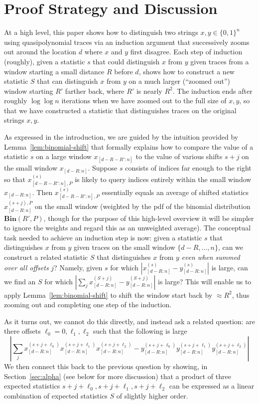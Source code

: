 \documentclass[11pt]{article}
\theoremstyle{plain}
\newcommand{\Bin}[2]{\textbf{Bin}(#1,#2)}
\begin{document}
\section{Proof Strategy and Discussion}\label{sec:overview}

At a high level, this paper shows how to distinguish two strings $x,y\in\{0,1\}^n$ using quasipolynomial traces via an induction argument that successively zooms out around the location $d$ where $x$ and $y$ first disagree. Each step of induction (roughly), given a statistic $s$ that could distinguish $x$ from $y$ given traces from a window starting a small distance $R$ before $d$, shows how to construct a new statistic $S$ that can distinguish $x$ from $y$ on a much larger (``zoomed out'') window starting $R'$ farther back, where $R'$ is nearly $R^2$. The induction ends after roughly $\log\log n$ iterations when we have zoomed out to the full size of $x,y$, so that we have constructed a statistic that distinguishes traces on the original strings $x,y$.

As expressed in the introduction, we are guided by the intuition provided by Lemma~\ref{lem:binomial-shift} that formally explains how to compare the value of a statistic $s$ on a large window $x_{[d-R-R':n]}$ to the value of various shifts $s+j$ on the small window $x_{[d-R:n]}$. Suppose $s$ consists of indices far enough to the right so that $x^{(s)}_{[d-R-R':n],P}$ is likely to query indices entirely within the small window $x_{[d-R:n]}$. Then $x^{(s)}_{[d-R-R':n],P}$ essentially equals an average of shifted statistics $x_{[d-R:n]}^{(s+j),P}$ on the small window (weighted by the pdf of the binomial distribution $\Bin{R'}{P}$, though for the purpose of this high-level overview it will be simpler to ignore the weights and regard this as an unweighted average). The conceptual task needed to achieve an induction step is now: given a statistic $s$ that distinguishes $x$ from $y$ given traces on the small window $\{d-R,\ldots,n\}$, can we construct a related statistic $S$ that distinguishes $x$ from $y$ \emph{even when summed over all offsets} $j$? Namely, given $s$ for which $\left|x_{[d-R:n]}^{(s)}-y_{[d-R:n]}^{(s)}\right|$ is large, can we find an $S$ for which $\left|\sum_j x_{[d-R:n]}^{(S+j)}-y_{[d-R:n]}^{(S+j)}\right|$ is large? This will enable us to apply Lemma~\ref{lem:binomial-shift} to shift the window start back by $\approx R^2$, thus zooming out and completing one step of the induction.

As it turns out, we cannot do this directly, and instead ask a related question: are there offsets $\ell_0=0,\ell_1,\ell_2$ such that the following is large \[\left|\sum_j x_{[d-R:n]}^{(s+j+\ell_0)}x_{[d-R:n]}^{(s+j+\ell_1)}x_{[d-R:n]}^{(s+j+\ell_2)}-y_{[d-R:n]}^{(s+j+\ell_0)}y_{[d-R:n]}^{(s+j+\ell_1)}y_{[d-R:n]}^{(s+j+\ell_2)}\right|\]
We then connect this back to the previous question by showing, in Section~\ref{sec:alpha} (see below for more discussion) that a product of three expected statistics $s+j+\ell_0,s+j+\ell_1,s+j+\ell_2$ can be expressed as a linear combination of expected statistics $S$ of slightly higher order.
\end{document}
